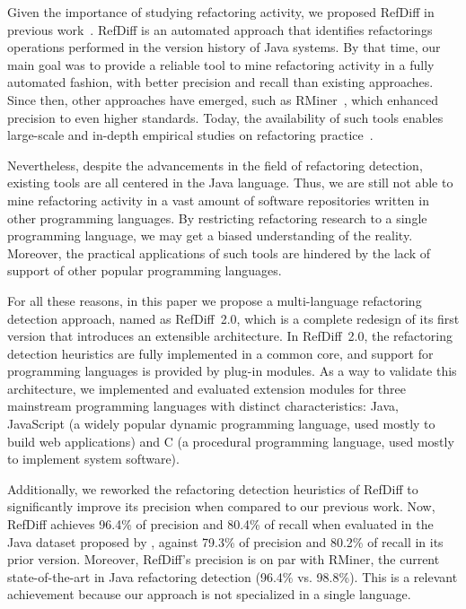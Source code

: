 Given the importance of studying refactoring activity, we proposed RefDiff in previous work~\citep{msr2017}. RefDiff is an automated approach that identifies refactorings operations performed in the version history of Java systems.
By that time, our main goal was to provide a reliable tool to mine refactoring activity in a fully automated fashion, with better precision and recall than existing approaches. Since then, other approaches have emerged, such as RMiner~\citep{tsantalis2018rminer}, which enhanced precision to even higher standards.
Today, the availability of such tools enables large-scale and in-depth empirical studies on refactoring practice~\citep{fse2016-why-we-refactor, icse2018}.

Nevertheless, despite the advancements in the field of refactoring detection, existing tools are all centered in the Java language.
Thus, we are still not able to mine refactoring activity in a vast amount of software repositories written in other programming languages.
By restricting refactoring research to a single programming language, we may get a biased understanding of the reality.
Moreover, the practical applications of such tools are hindered by the lack of support of other popular programming languages.

For all these reasons, in this paper we propose a multi-language refactoring detection approach, named as RefDiff~2.0, which is a complete redesign of its first version that introduces an extensible architecture.
In RefDiff~2.0, the refactoring detection heuristics are fully implemented in a common core, and support for programming languages is provided by plug-in modules.
As a way to validate this architecture, we implemented and evaluated extension modules for three mainstream programming languages with distinct characteristics: Java, JavaScript (a widely popular dynamic programming language, used mostly to build web applications) and C (a procedural programming language, used mostly to implement system software).

Additionally, we reworked the refactoring detection heuristics of RefDiff to significantly improve its precision when compared to our previous work.
Now, RefDiff achieves 96.4\% of precision and 80.4\% of recall when evaluated in the Java dataset proposed by \cite{tsantalis2018rminer}, against 79.3\% of precision and 80.2\% of recall in its prior version.
Moreover, RefDiff's precision is on par with RMiner, the current state-of-the-art in Java refactoring detection (96.4\% vs. 98.8\%).
This is a relevant achievement because our approach is not specialized in a single language.

